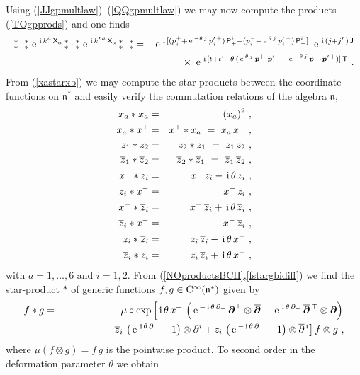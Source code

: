 \documentclass[11pt,a4paper]{article}
\newcommand{\NOa}{\mbox{$\substack{\ast\\\ast}$}}       %
\def\nn{\nonumber}
\newcommand{\1}{\mathbb{1}}
\newcommand{\mbf}[1]{{\boldsymbol {#1} }}
\def\ii{{\,{\rm i}\,}}
\def\CC{{\rm C}}
\def\P{{\sf P}}
\def\T{{\sf T}}
\def\X{{\sf X}}
\def\J{{\sf J}}
\def\mbp{{\mbf p}}
\def\mdell{{\mbf\partial}}
\def\mfn{{\mathfrak n}}
\def\nn{\nonumber}
\def\e{{\,\rm e}\,}
\def\bea{\begin{eqnarray}}
\def\eea{\end{eqnarray}}
\newcommand{\z}{\zeta}
\begin{document}
Using (\ref{JJgpmultlaw})--(\ref{QQgpmultlaw}) we may now compute the
products (\ref{TOgpprods}) and one finds
\bea
\NOa~~\NOa\,\e^{\ii k^a\,\X_a}\,\NOa\cdot\NOa\,\e^{\ii k^{\prime\,a}\,\X_a}
\,\NOa~~\NOa&=&\e^{\ii[(p_i^++\e^{-\theta\,j}\,p_i^{\prime\,+})\,
\P^i_++(p_i^-+\e^{\theta\,j}\,p_i^{\prime\,-})\,\P^i_-]}~
\e^{\ii(j+j'\,)\,\J}\nonumber\\ &&\times~
\e^{\ii[t+t'-\theta\,(\e^{\theta\,j}\,
\mbp^+\cdot\mbp^{\prime\,-}-\e^{-\theta\,j}\,
\mbp^-\cdot\mbp^{\prime\,+})]\,\T} \ .
\label{TOgpprodexpl}\eea
From (\ref{xastarxb}) we may compute the star-products between the
coordinate functions on $\mfn^*$ and easily verify the commutation
relations of the algebra $\mfn$,
\bea
x_a*x_a&=&(x_a)^2 \ , \nonumber\\x_a*x^+&=&x^+*x_a~=~x_a\,x^+ \ ,
\nonumber\\z_1*z_2&=&z_2*z_1~=~z_1\,z_2 \ , \nonumber\\
\overline{z}_1*\overline{z}_2&=&\overline{z}_2*\overline{z}_1
~=~\overline{z}_1\,\overline{z}_2 \ , \nonumber\\
x^-*z_i&=&x^-\,z_i-\ii\theta\,z_i \ , \nonumber\\
z_i*x^-&=&x^-\,z_i \ , \nonumber\\
x^-*\overline{z}_i&=&x^-\,\overline{z}_i+\ii\theta\,\overline{z}_i \ ,
\nonumber\\ \overline{z}_i*x^-&=&x^-\,\overline{z}_i \ , \nonumber\\
z_i*\overline{z}_i&=&z_i\,\overline{z}_i-\ii\theta\,x^+ \ , \nn\\
\overline{z}_i*z_i&=&z_i\,\overline{z}_i+\ii\theta\,x^+ \ ,
\label{TOcoordstarprods}\eea
with $a=1,\dots,6$ and $i=1,2$. From
(\ref{NOproductsBCH},\ref{fstargbidiff}) we find the star-product $*$
of generic functions $f,g\in\CC^{\infty}(\mfn^*)$ given by
\bea
f*g&=&\mu\circ\exp\left[\ii\theta\,x^+\,\left(\e^{-\ii\theta\,\partial_-}\,
\mdell^\top\otimes\overline{\mdell}-\e^{\ii\theta\,\partial_-}\,
{\overline{\mdell}}{}^{\,\top}\otimes\mdell\right)\right.\nonumber
\\ &&\qquad\qquad+\left.\overline{z}_i\,
\left(\e^{\ii\theta\,\partial_-}-1\right)\otimes
\partial^i+z_i\,\left(\e^{-\ii\theta\,\partial_-}-1\right)
\otimes\overline{\partial}{}^{\,i}\right]f\otimes g \ ,
\label{TOstargen}\eea
where $\mu(f\otimes g)=f\,g$ is the pointwise product. To second order
in the deformation parameter $\theta$ we obtain
\end{document}
